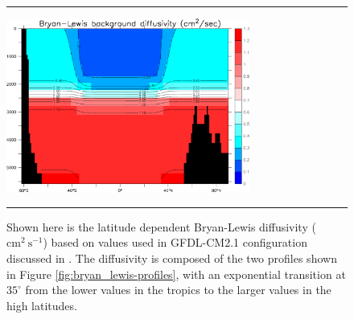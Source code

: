 \begin{figure}[h!t]
\rule{\textwidth}{0.005in}
\begin{center}
\includegraphics[angle=0,width=8cm]{./figs/bl_diffusivity.pdf}
\caption[Latitude-depth Bryan-Lewis diffusivity]{Shown here is the
  latitude dependent Bryan-Lewis diffusivity
  ($\mbox{cm}^{2}~\mbox{s}^{-1}$) based on values used in GFDL-CM2.1
  configuration discussed in \cite{OMDT2005a}.  The diffusivity is
  composed of the two profiles shown in Figure
  \ref{fig:bryan_lewis-profiles}, with an exponential transition at
  $35^{\circ}$ from the lower values in the tropics to the larger
  values in the high latitudes.}
\label{fig:bryan_lewis-lat-depth}
\end{center}
\rule{\textwidth}{0.005in}
\end{figure}


